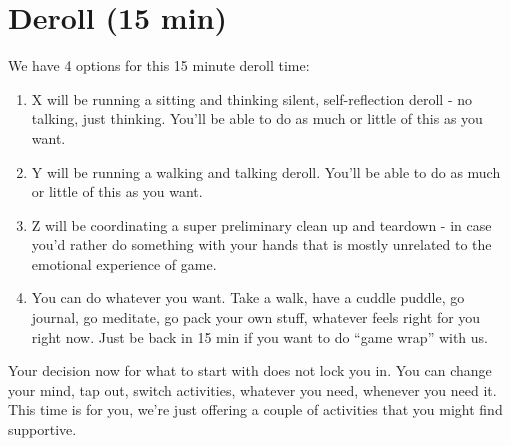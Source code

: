 \documentclass[green]{GL2020}
\begin{document}
\name{\gPostGame{}}

\section*{Deroll (15 min)}
We have 4 options for this 15 minute deroll time:
\begin{enumerate}
	\item X will be running a sitting and thinking silent, self-reflection deroll - no talking, just thinking. You’ll be able to do as much or little of this as you want.
	\item Y will be running a walking and talking deroll. You’ll be able to do as much or little of this as you want.
	\item Z will be coordinating a super preliminary clean up and teardown - in case you’d rather do something with your hands that is mostly unrelated to the emotional experience of game.
	\item You can do whatever you want. Take a walk, have a cuddle puddle, go journal, go meditate, go pack your own stuff, whatever feels right for you right now. Just be back in 15 min if you want to do ``game wrap'' with us.
\end{enumerate}

Your decision now for what to start with does not lock you in. You can change your mind, tap out, switch activities, whatever you need, whenever you need it. This time is for you, we’re just offering a couple of activities that you might find supportive.
\end{document}
